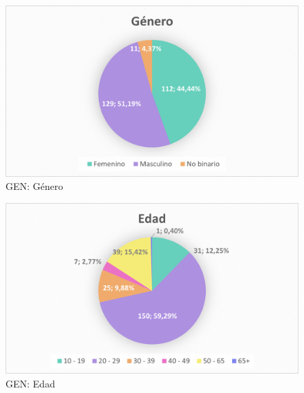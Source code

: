 \documentclass[12pt, a4paper,twoside,titlepage]{book}
\begin{document}
\begin{figure}
    \centering
    \includegraphics[width=.8\linewidth]{ANEXO Gen/1AnexGENGen}
    \caption{GEN: Género}
    \label{fig:GENGenero}
\end{figure}


\begin{figure}
    \centering
    \includegraphics[width=.8\linewidth]{ANEXO Gen/2AnexGENEdad}
    \caption{GEN: Edad}
    \label{fig:GENEdad}
\end{figure}
\end{document}
